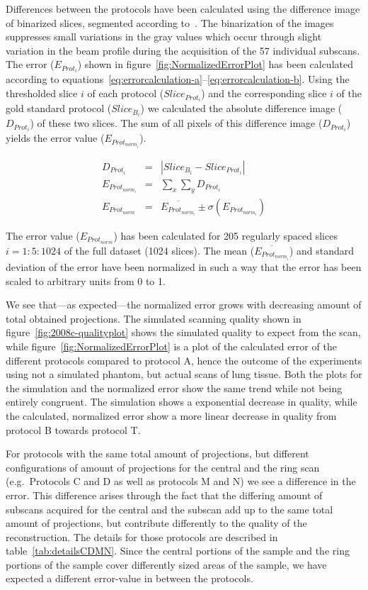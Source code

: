 Differences between the protocols have been calculated using the difference image of binarized slices, segmented according to~\citet{Otsu1979}. The binarization of the images suppresses small variations in the gray values which occur through slight variation in the beam profile during the acquisition of the 57 individual subscans. The error ($E_{Prot_{i}}$) shown in figure~\ref{fig:NormalizedErrorPlot} has been calculated according to equations~\ref{eq:errorcalculation-a}--\ref{eq:errorcalculation-b}. Using the thresholded slice $i$ of each protocol ($Slice_{Prot_{i}}$) and the corresponding slice $i$ of the gold standard protocol ($Slice_{B_{i}}$) we calculated the absolute difference image ($D_{Prot_{i}}$) of these two slices. The sum of all pixels of this difference image ($D_{Prot_{i}}$) yields the error value ($E_{Prot_{norm_{i}}}$).

\begin{eqnarray}
       D_{Prot_{i}} &=& |Slice_{B_{i}}-Slice_{Prot_{i}}|\label{eq:errorcalculation-a}\\
E_{Prot_{norm_{i}}} &=& \sum_{x}\sum_{y} D_{Prot_{i}}\label{eq:errorcalculation-b}\\
    E_{Prot_{norm}} &=& \overline{E_{Prot_{norm_{i}}}} \pm \sigma(E_{Prot_{norm_{i}}})\label{eq:errorcalculation-c}
\end{eqnarray}

The error value ($E_{Prot_{norm}}$) has been calculated for 205 regularly spaced slices $i=1:5:1024$ of the full dataset (1024 slices). The mean ($\overline{E_{Prot_{norm_{i}}}}$) and standard deviation of the error have been normalized in such a way that the error has been scaled to arbitrary units from 0 to 1.

We see that---as expected---the normalized error grows with decreasing amount of total obtained projections. The simulated scanning quality shown in figure~\ref{fig:2008c-qualityplot} shows the simulated quality to expect from the scan, while figure~\ref{fig:NormalizedErrorPlot} is a plot of the calculated error of the different protocols compared to protocol A, hence the outcome of the experiments using not a simulated phantom, but actual scans of lung tissue. Both the plots for the simulation and the normalized error show the same trend while not being entirely congruent. The simulation shows a exponential decrease in quality, while the calculated, normalized error show a more linear decrease in quality from protocol B towards protocol T.

For protocols with the same total amount of projections, but different configurations of amount of projections for the central and the ring scan (e.g.\ Protocols C and D as well as protocols M and N) we see a difference in the error. This difference arises through the fact that the differing amount of subscans acquired for the central and the subscan add up to the same total amount of projections, but contribute differently to the quality of the reconstruction. The details for those protocols are described in table~\ref{tab:detailsCDMN}. Since the central portions of the sample and the ring portions of the sample cover differently sized areas of the sample, we have expected a different error-value in between the protocols. 

